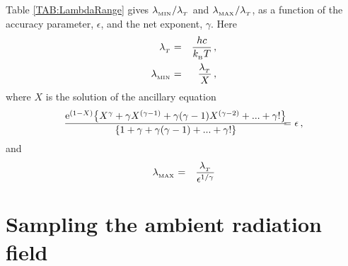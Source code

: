 \documentclass[usenatbib]{mn2e}
\numberwithin{equation}{section}
\begin{document}
Table \ref{TAB:LambdaRange} gives $\lambda_{_{\rm MIN}}/\lambda_{_T}$ and $\lambda_{_{\rm MAX}}/\lambda_{_T}$, as a function of the accuracy parameter, $\epsilon$, and the net exponent, $\gamma$. Here
\begin{eqnarray}
\lambda_{_T}&=&\frac{hc}{k_{_{\rm B}}T}\,,\\
\lambda_{_{\rm MIN}}&=&\frac{\lambda_{_T}}{X}\,,
\end{eqnarray}
where $X$ is the solution of the ancillary equation
\begin{eqnarray}\nonumber
\frac{{\rm e}^{(1-X)}\!\left\{X^\gamma+\gamma X^{(\gamma-1)}+\gamma(\gamma -1)X^{(\gamma -2)}+...+\gamma!\right\}}{\left\{1+\gamma+\gamma(\gamma -1)+...+\gamma!\right\}}\!\!&\!\!=\!\!&\!\!\epsilon\,,\\
\end{eqnarray}
and 
\begin{eqnarray}
\lambda_{_{\rm MAX}}&=&\frac{\lambda_{_T}}{\epsilon^{1/\gamma}}
\end{eqnarray}






\section{Sampling the ambient radiation field}
\end{document}
